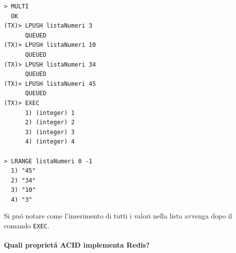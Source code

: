 \begin{lstlisting}[autogobble]
> MULTI
  OK
(TX)> LPUSH listaNumeri 3
      QUEUED
(TX)> LPUSH listaNumeri 10
      QUEUED
(TX)> LPUSH listaNumeri 34
      QUEUED
(TX)> LPUSH listaNumeri 45
      QUEUED
(TX)> EXEC
      1) (integer) 1
      2) (integer) 2
      3) (integer) 3
      4) (integer) 4

> LRANGE listaNumeri 0 -1
  1) "45"
  2) "34"
  3) "10"
  4) "3"\end{lstlisting}
Si puó notare come l'inserimento di tutti i valori nella lista avvenga dopo il comando \texttt{EXEC}.\\

\paragraph{Quali proprietá ACID implementa Redis?\\}
